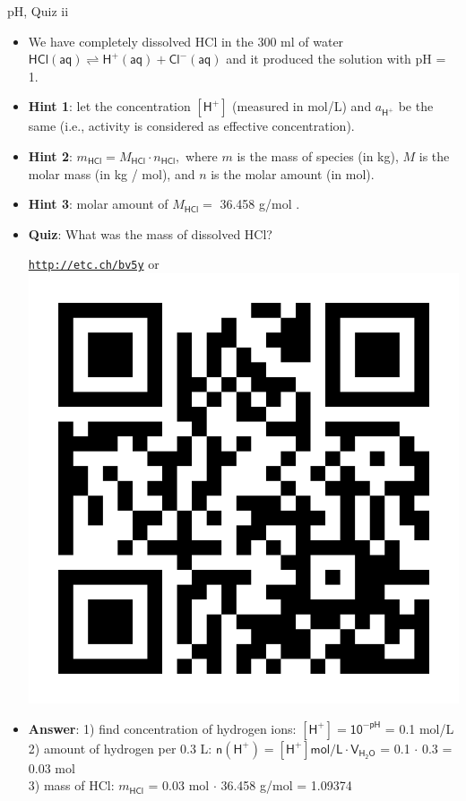 \begin{frame}{pH, Quiz \: ii}
	\small
	\begin{itemize}
		\item We have completely dissolved HCl in the 300 ml of water  
		$\mathsf{HCl(aq) \rightleftharpoons H^+(aq) + Cl^-(aq)}$
		 and it produced the solution with pH = 1. 
		\pause
		\item {\bf Hint 1}: let the concentration $[\mathsf{H^+}]$ (measured in mol/L) and $a_{\mathsf{H^+}}$ be the same (i.e., activity is considered as effective concentration). 
		\item {\bf Hint 2}: $m_{\mathsf{HCl}} = M_{\mathsf{HCl}}  \cdot n_{\mathsf{HCl}},$ 
		where $m$ is the mass of species (in kg), 
		$M$ is the molar mass (in kg / mol), and 
		$n$ is the molar amount (in mol). 
		\item {\bf Hint 3}: molar amount of $M_{\mathsf{HCl}} = $ 36.458 g/mol .
		\pause
		\item  \alert{\bf Quiz}: What was the mass of dissolved HCl?
		\begin{center}
			\href{http://etc.ch/bv5y}{\textcolor{indigo(dye)}{\tt http://etc.ch/bv5y}} 
			\quad
			or 
			\quad
			\includegraphics[height=0.13\columnwidth]{figures/chemical-equilibrium/poll.png}
		\end{center}
 		\hiddenpause
 		\item {\bf Answer}: 
        1) find concentration of hydrogen ions: 
        $\mathsf{[H^+] = 10^{-pH}}$ = 0.1 mol/L \\
        2) amount of hydrogen per 0.3 L: 
        $\mathsf{n(H^+) = [H^+] mol/L \cdot V_{H_2O}}$ 
        = 0.1 $\cdot$ 0.3 = 0.03 mol \\
        3) mass of HCl: 
        $m_{\mathsf{HCl}}$ = 0.03 mol $\cdot$ 36.458 g/mol = 1.09374 
	\end{itemize}
\end{frame}
%
